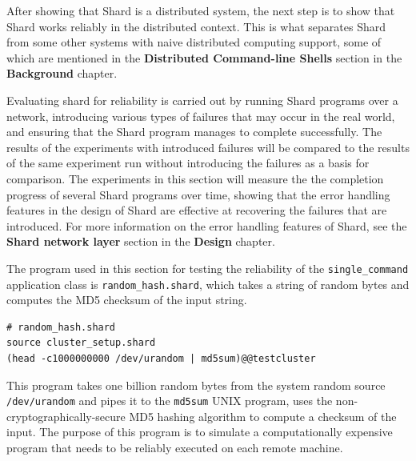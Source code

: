 \documentclass[twoside]{report}
\begin{document}

After showing that Shard is a distributed system, the next step is to show that Shard works reliably in the distributed context.
This is what separates Shard from some other systems with naive distributed computing support, some of which are mentioned in the \textbf{Distributed Command-line Shells} section in the \textbf{Background} chapter.

Evaluating shard for reliability is carried out by running Shard programs over a network, introducing various types of failures that may occur in the real world, and ensuring that the Shard program manages to complete successfully.
The results of the experiments with introduced failures will be compared to the results of the same experiment run without introducing the failures as a basis for comparison.
The experiments in this section will measure the the completion progress of several Shard programs over time, showing that the error handling features in the design of Shard are effective at recovering the failures that are introduced.
For more information on the error handling features of Shard, see the \textbf{Shard network layer} section in the \textbf{Design} chapter.

The program used in this section for testing the reliability of the \texttt{single\_command} application class is \texttt{random\_hash.shard}, which takes a string of random bytes and computes the MD5 checksum of the input string.
\begin{lstlisting}[language=Shard]
# random_hash.shard
source cluster_setup.shard
(head -c1000000000 /dev/urandom | md5sum)@@testcluster
\end{lstlisting}

This program takes one billion random bytes from the system random source \texttt{/dev/urandom} and pipes it to the \texttt{md5sum} UNIX program, uses the non-cryptographically-secure MD5 hashing algorithm to compute a checksum of the input.
The purpose of this program is to simulate a computationally expensive program that needs to be reliably executed on each remote machine.
\end{document}
